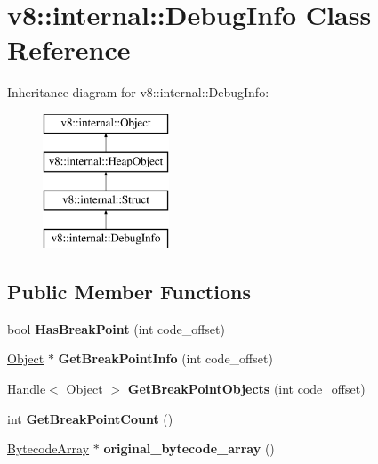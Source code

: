 \hypertarget{classv8_1_1internal_1_1_debug_info}{}\section{v8\+:\+:internal\+:\+:Debug\+Info Class Reference}
\label{classv8_1_1internal_1_1_debug_info}
Inheritance diagram for v8\+:\+:internal\+:\+:Debug\+Info\+:\begin{figure}[H]
\begin{center}
\leavevmode
\includegraphics[height=4.000000cm]{classv8_1_1internal_1_1_debug_info}
\end{center}
\end{figure}
\subsection*{Public Member Functions}
\begin{DoxyCompactItemize}
\item 
bool {\bfseries Has\+Break\+Point} (int code\+\_\+offset)\hypertarget{classv8_1_1internal_1_1_debug_info_afd7cb9da50911578f35471709f2e94d3}{}\label{classv8_1_1internal_1_1_debug_info_afd7cb9da50911578f35471709f2e94d3}

\item 
\hyperlink{classv8_1_1internal_1_1_object}{Object} $\ast$ {\bfseries Get\+Break\+Point\+Info} (int code\+\_\+offset)\hypertarget{classv8_1_1internal_1_1_debug_info_a2fde80a8b6969138cfb96cbce027d54f}{}\label{classv8_1_1internal_1_1_debug_info_a2fde80a8b6969138cfb96cbce027d54f}

\item 
\hyperlink{classv8_1_1internal_1_1_handle}{Handle}$<$ \hyperlink{classv8_1_1internal_1_1_object}{Object} $>$ {\bfseries Get\+Break\+Point\+Objects} (int code\+\_\+offset)\hypertarget{classv8_1_1internal_1_1_debug_info_a76adb88d51650827760de0c4902eeb49}{}\label{classv8_1_1internal_1_1_debug_info_a76adb88d51650827760de0c4902eeb49}

\item 
int {\bfseries Get\+Break\+Point\+Count} ()\hypertarget{classv8_1_1internal_1_1_debug_info_ae63dfb49054ac553acfd8cb94bab6bba}{}\label{classv8_1_1internal_1_1_debug_info_ae63dfb49054ac553acfd8cb94bab6bba}

\item 
\hyperlink{classv8_1_1internal_1_1_bytecode_array}{Bytecode\+Array} $\ast$ {\bfseries original\+\_\+bytecode\+\_\+array} ()\hypertarget{classv8_1_1internal_1_1_debug_info_a94394bc6d24db0c61c6bfb3013ef7e46}{}\label{classv8_1_1internal_1_1_debug_info_a94394bc6d24db0c61c6bfb3013ef7e46}

\end{DoxyCompactItemize}
